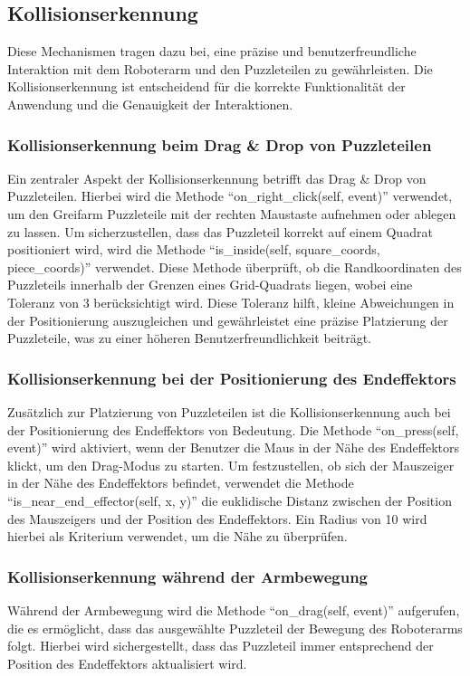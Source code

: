 \documentclass[12pt]{article}
\begin{document}
        \subsection{Kollisionserkennung}
            Diese Mechanismen tragen dazu bei, eine präzise und benutzerfreundliche Interaktion mit dem 
            Roboterarm und den Puzzleteilen zu gewährleisten. Die Kollisionserkennung ist entscheidend für
            die korrekte Funktionalität der Anwendung und die Genauigkeit der Interaktionen.
            
            \subsubsection{Kollisionserkennung beim Drag \& Drop von Puzzleteilen}
                Ein zentraler Aspekt der Kollisionserkennung betrifft das Drag & Drop von Puzzleteilen. Hierbei wird
                die Methode “on\_right\_click(self, event)” verwendet, um den Greifarm Puzzleteile mit der rechten
                Maustaste aufnehmen oder ablegen zu lassen. Um sicherzustellen, dass das Puzzleteil korrekt auf
                einem Quadrat positioniert wird, wird die Methode “is\_inside(self, square\_coords, piece\_coords)”
                verwendet. Diese Methode überprüft, ob die Randkoordinaten des Puzzleteils innerhalb der Grenzen 
                eines Grid-Quadrats liegen, wobei eine Toleranz von 3 berücksichtigt wird. Diese Toleranz hilft,
                kleine Abweichungen in der Positionierung auszugleichen und gewährleistet eine präzise Platzierung
                der Puzzleteile, was zu einer höheren Benutzerfreundlichkeit beiträgt.
    
            \subsubsection{Kollisionserkennung bei der Positionierung des Endeffektors}
                Zusätzlich zur Platzierung von Puzzleteilen ist die Kollisionserkennung auch bei der Positionierung
                des Endeffektors von Bedeutung. Die Methode “on\_press(self, event)” wird aktiviert, wenn der Benutzer
                die Maus in der Nähe des Endeffektors klickt, um den Drag-Modus zu starten. Um festzustellen, ob sich
                der Mauszeiger in der Nähe des Endeffektors befindet, verwendet die Methode
                “is\_near\_end\_effector(self, x, y)” die euklidische Distanz zwischen der Position des Mauszeigers und
                der Position des Endeffektors. Ein Radius von 10 wird hierbei als Kriterium verwendet, um die Nähe
                zu überprüfen.

            \subsubsection{Kollisionserkennung während der Armbewegung}
                Während der Armbewegung wird die Methode “on\_drag(self, event)” aufgerufen, die es ermöglicht, dass
                das ausgewählte Puzzleteil der Bewegung des Roboterarms folgt. Hierbei wird sichergestellt, dass das
                Puzzleteil immer entsprechend der Position des Endeffektors aktualisiert wird.
\end{document}
